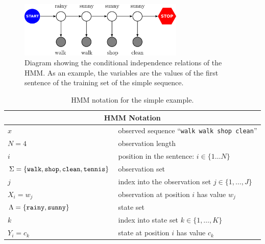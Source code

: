 \begin{figure}[ht]
\centering
\includegraphics[width=0.7\textwidth]{figs/sequences/hmm_new}
\caption[HMM running example]{\label{fig:hmm}Diagram showing the conditional independence relations of the HMM. As an example, the variables are the values of the first sentence of the training set of the simple sequence.}
\end{figure}

\begin{table}[h]
\begin{center}
\begin{tabular}{|l|l|}
\hline
\multicolumn{2}{|c|}{HMM Notation}\\
\hline
\hline
$x$ & observed sequence ``{\tt walk walk shop clean}'' \\
\hline
$N = 4$ & observation length \\
\hline
$i$ & position in the sentence: $i \in \{1 \ldots N\}$ \\
\hline
$\Sigma = \{\text{{\tt walk}},\text{{\tt shop}},\text{{\tt clean}},\text{{\tt tennis}}\}$ & observation set \\
\hline 
$j$ & index into the observation set $j \in \{1,\ldots, J\}$\\
\hline
$X_i = w_j$ & observation at position $i$ 
has value $w_j$\\
\hline 
$\Lambda = \{\text{{\tt rainy}},\text{{\tt sunny}}\}$ & state set\\
\hline 
$k$ & index into state set $k \in \{1,\ldots,K\}$\\
\hline
$Y_i = c_k$ & state at position $i$ has value $c_k$ \\ %
\hline
\end{tabular}
\end{center}
\caption[HMM notation]{\label{tab:hmm-simple-notation} HMM notation for the simple example.}
\end{table}



